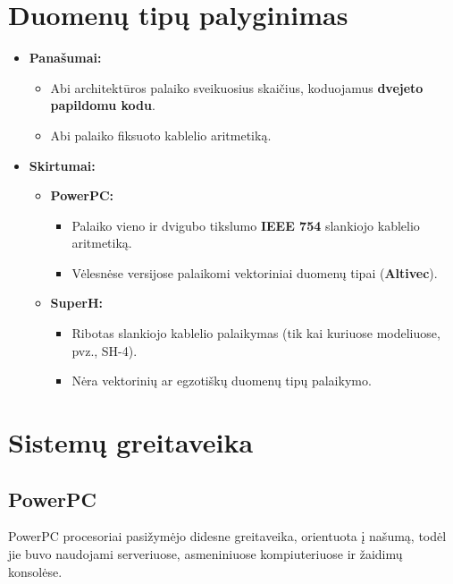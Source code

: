 \documentclass{article}
\begin{document}
\section*{Duomenų tipų palyginimas}
\begin{itemize}
    \item \textbf{Panašumai:}
        \begin{itemize}
            \item Abi architektūros palaiko sveikuosius skaičius, koduojamus \textbf{dvejeto papildomu kodu}.
            \item Abi palaiko fiksuoto kablelio aritmetiką.
        \end{itemize}
    \item \textbf{Skirtumai:}
        \begin{itemize}
            \item \textbf{PowerPC:}
                \begin{itemize}
                    \item Palaiko vieno ir dvigubo tikslumo \textbf{IEEE 754} slankiojo kablelio aritmetiką.
                    \item Vėlesnėse versijose palaikomi vektoriniai duomenų tipai (\textbf{Altivec}).
                \end{itemize}
            \item \textbf{SuperH:}
                \begin{itemize}
                    \item Ribotas slankiojo kablelio palaikymas (tik kai kuriuose modeliuose, pvz., SH-4).
                    \item Nėra vektorinių ar egzotiškų duomenų tipų palaikymo.
                \end{itemize}
        \end{itemize}
\end{itemize}

\section{Sistemų greitaveika}
\subsection{PowerPC}
PowerPC procesoriai pasižymėjo didesne greitaveika, orientuota į našumą, todėl jie buvo naudojami serveriuose, asmeniniuose kompiuteriuose ir žaidimų konsolėse.
\end{document}
